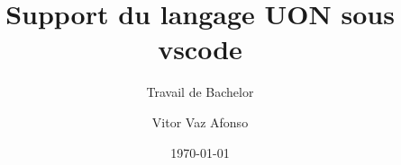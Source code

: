\author{Vitor Vaz Afonso}


\title{Support du langage UON sous vscode}

\subtitle{Travail de Bachelor}


\date{\today}


